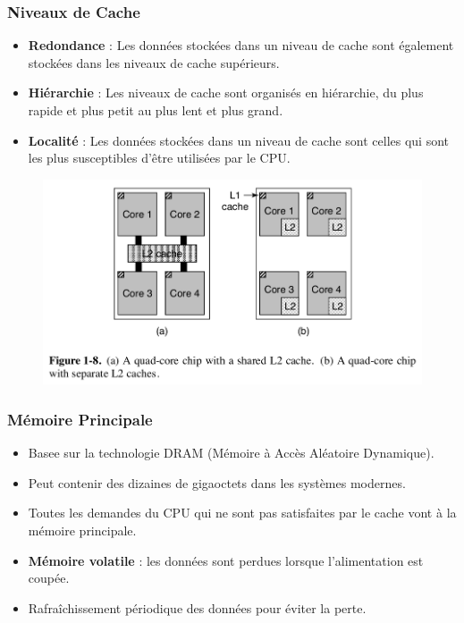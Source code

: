 \documentclass[10pt]{beamer}
\begin{document}
\begin{frame}
    \frametitle{Niveaux de Cache}
    \begin{itemize}
        \item \textbf{Redondance} : Les données stockées dans un niveau de
              cache
              sont également stockées dans les niveaux de cache supérieurs.
        \item \textbf{Hiérarchie} : Les niveaux de cache sont organisés en
              hiérarchie, du plus rapide et plus petit au plus lent et plus
              grand.
        \item \textbf{Localité} : Les données stockées dans un niveau de cache
              sont
              celles qui sont les plus susceptibles d'être utilisées par le
              CPU.
    \end{itemize}
    \begin{figure}
        \centering
        \includegraphics[width=.6\textwidth]{figures/ProcCoresCache_T.png}
    \end{figure}
\end{frame}

\begin{frame}
    \frametitle{Mémoire Principale}
    \begin{itemize}
        \item Basee sur la technologie DRAM (Mémoire à Accès Aléatoire
              Dynamique).
        \item Peut contenir des dizaines de gigaoctets dans les
              systèmes modernes.
        \item Toutes les demandes du CPU qui ne sont pas
              satisfaites par le cache vont à la mémoire principale.
        \item \textbf{Mémoire volatile} : les données sont perdues lorsque
              l'alimentation est coupée.
        \item Rafraîchissement périodique des données pour éviter la perte.
    \end{itemize}
\end{frame}
\end{document}
